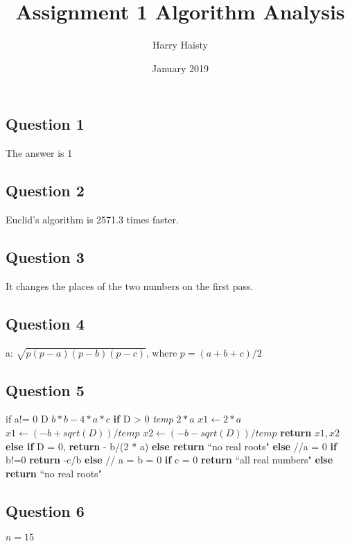 \documentclass{article}
\title{Assignment 1 Algorithm Analysis}
\author{Harry Haisty}
\date{January 2019}
\begin{document}
\maketitle

\subsection*{Question 1}
The answer is 1

\subsection*{Question 2}
Euclid's algorithm is 2571.3 times faster.

\subsection*{Question 3}
It changes the places of the two numbers on the first pass.

\subsection*{Question 4}
a: $\sqrt{p(p-a)(p-b)(p-c)}$, where $p=(a+b+c)/2$

\subsection*{Question 5}
if a!= 0
\newline
D \leftarrow $ b*b-4*a*c$
\newline \newline
\textbf{if } D > 0
\textit{temp} \leftarrow $2*a$
$x1 \leftarrow 2 * a$
\newline
$x1 \leftarrow (-b + sqrt(D))/temp$
\newline
$x2 \leftarrow (-b- sqrt(D))/temp$
\newline
\newline
\textbf{return} $x1, x2$
\newline
\textbf{else if } D = 0, \textbf{return} - b/(2 * a)
\newline
\textbf{else return} ``no real roots"
\newline
\textbf{else} //a = 0
\newline
\textbf{if} b!=0 \textbf{return} -c/b
\newline
\textbf{else} // a = b = 0
\textbf{if} c = 0 \textbf{return} ``all real numbers"
\newline
\textbf{else return} ``no real roots"

\subsection*{Question 6}
$n = 15$
\end{document}
